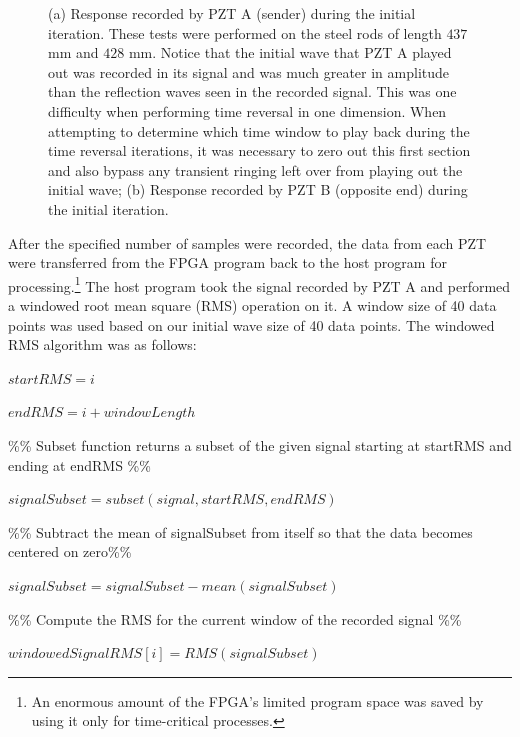 \documentclass[11pt,letterpaper]{article}%
\begin{document}
\begin{figure}
\begin{subfigmatrix}{2}
\end{subfigmatrix}
%
   \caption[all]
   { \label{initRead}
(a) Response recorded by PZT A (sender) during the initial iteration. These tests were performed on the steel rods of length $437$ mm and $428$ mm. Notice that the initial wave that PZT A played out was recorded in its signal and was much greater in amplitude than the reflection waves seen in the recorded signal. This was one difficulty when performing time reversal in one dimension. When attempting to determine which time window to play back during the time reversal iterations, it was necessary to zero out this first section and also bypass any transient ringing left over from playing out the initial wave;
(b) Response recorded by PZT B (opposite end) during the initial iteration.
 }
   \end{figure}

After the specified number of samples were recorded, the data from each PZT were transferred from the FPGA program back to the host program for processing.\footnote{An enormous amount of the FPGA's limited program space was saved by using it only for time-critical processes.} The host program took the signal recorded by PZT A and performed a windowed root mean square (RMS) operation on it. A window size of 40 data points was used based on our initial wave size of 40 data points. The windowed RMS algorithm was as follows:

\begin{algorithmic}


$startRMS = i$

$endRMS = i + windowLength$

\%\% Subset function returns a subset of the given signal starting at startRMS and ending at endRMS \%\%

$signalSubset = subset( signal, startRMS, endRMS )$

\%\% Subtract the mean of signalSubset from itself so that the data becomes centered on zero\%\%

$signalSubset = signalSubset  - mean(signalSubset)$

\%\% Compute the RMS for the current window of the recorded signal \%\%

$windowedSignalRMS[ i ] = RMS( signalSubset ) $	

\EndFor

\end{algorithmic}
\end{document}
